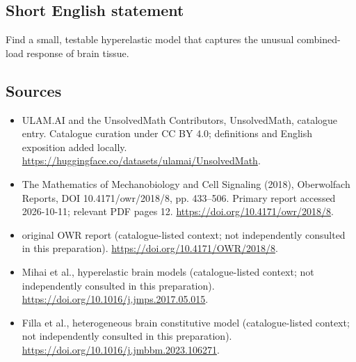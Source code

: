 \documentclass[11pt]{article}
\begin{document}
\subsection{Short English statement}
Find a small, testable hyperelastic model that captures the unusual combined-load response of brain tissue.
\subsection{Sources}
\begin{itemize}
\item[\hypertarget{source:statement:1}{S1}] ULAM.AI and the UnsolvedMath Contributors, UnsolvedMath, catalogue entry. Catalogue curation under CC BY 4.0; definitions and English exposition added locally.
\url{https://huggingface.co/datasets/ulamai/UnsolvedMath}.
\item[\hypertarget{source:statement:2}{S2}] The Mathematics of Mechanobiology and Cell Signaling (2018), Oberwolfach Reports, DOI 10.4171/owr/2018/8, pp. 433--506. Primary report accessed 2026-10-11; relevant PDF pages 12.
\url{https://doi.org/10.4171/owr/2018/8}.
\item[\hypertarget{source:statement:3}{S3}] original OWR report (catalogue-listed context; not independently consulted in this preparation).
\url{https://doi.org/10.4171/OWR/2018/8}.
\item[\hypertarget{source:statement:4}{S4}] Mihai et al., hyperelastic brain models (catalogue-listed context; not independently consulted in this preparation).
\url{https://doi.org/10.1016/j.jmps.2017.05.015}.
\item[\hypertarget{source:statement:5}{S5}] Filla et al., heterogeneous brain constitutive model (catalogue-listed context; not independently consulted in this preparation).
\url{https://doi.org/10.1016/j.jmbbm.2023.106271}.
\end{itemize}
\label{end:statement}
\end{document}

